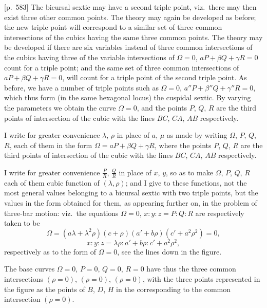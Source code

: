 \documentclass[11pt,a4paper]{book}
\begin{document}
[p.~583] The bicursal sextic may have a second triple point, viz.\ there may then exist three other common points. The theory may again be developed as before; the new triple point will correspond to a similar set of three common intersections of the cubics having the same three common points. The theory may be developed if there are six variables instead of three common intersections of the cubics having three of the variable intersections of $\Omega = 0$, $aP + \beta Q + \gamma R = 0$ count for a triple point; and the same set of three common intersections of $aP + \beta Q + \gamma R = 0$, will count for a triple point of the second triple point. As before, we have a number of triple points such as $\Omega = 0$, $a''P + \beta''Q + \gamma''R = 0$, which thus form (in the same hexagonal locus) the cuspidal sextic. By varying the parameters we obtain the curve $\Omega = 0$, and the points $P$, $Q$, $R$ are the third points of intersection of the cubic with the lines $BC$, $CA$, $AB$ respectively.

I write for greater convenience $\lambda$, $\rho$ in place of $a$, $\mu$ as made by writing $\Omega$, $P$, $Q$, $R$, each of them in the form $\Omega = aP + \beta Q + \gamma R$, where the points $P$, $Q$, $R$ are the third points of intersection of the cubic with the lines $BC$, $CA$, $AB$ respectively.

I write for greater convenience $\frac{P}{R}$, $\frac{Q}{R}$ in place of $x$, $y$, so as to make $\Omega$, $P$, $Q$, $R$ each of them cubic function of $(\lambda, \rho)$; and I give to these functions, not the most general values belonging to a bicursal sextic with two triple points, but the values in the form obtained for them, as appearing further on, in the problem of three-bar motion: viz.\ the equations $\Omega = 0$, $x : y : z = P : Q : R$ are respectively taken to be
\[
\Omega = (a\lambda + \lambda^2\rho)(c + \rho)(a' + b\rho)(c' + a^2\rho^2) = 0,
\]
\[
x : y : z = \lambda\rho : a' + b\rho : c' + a^2\rho^2,
\]
respectively as to the form of $\Omega = 0$, see the lines down in the figure.

The base curves $\Omega = 0$, $P = 0$, $Q = 0$, $R = 0$ have thus the three common intersections
$(\rho = 0)$, $(\rho = 0)$, $(\rho = 0)$, with the three points represented in the figure as the points of $B$, $D$, $H$ in the corresponding to the common intersection $(\rho = 0)$.

\bigskip
\end{document}
